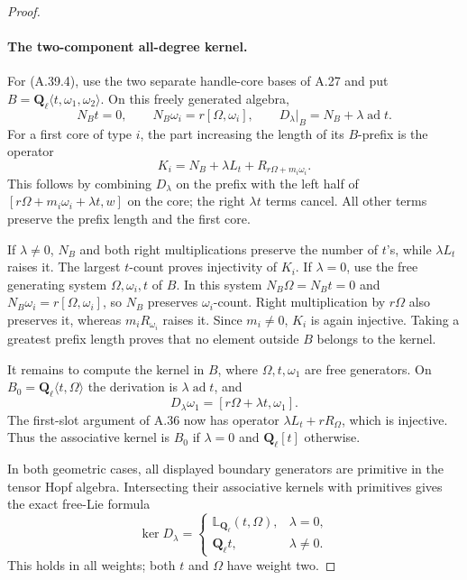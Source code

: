 \begin{proof}
\paragraph{The two-component all-degree kernel.}
For (A.39.4), use the two separate handle-core
bases of A.27 and put
\(B=\mathbf Q_\ell\langle t,\omega_1,\omega_2\rangle\).
On this freely generated algebra,
\[
 N_Bt=0,\qquad N_B\omega_i=r[\Omega,\omega_i],
 \qquad D_\lambda|_B=N_B+\lambda\operatorname{ad}t.
                                                               \tag{A.39.8}
\]
For a first core of type \(i\), the part increasing
the length of its \(B\)-prefix is the operator
\[
 K_i=N_B+\lambda L_t+R_{r\Omega+m_i\omega_i}.
                                                               \tag{A.39.9}
\]
This follows by combining \(D_\lambda\) on the
prefix with the left half of
\([r\Omega+m_i\omega_i+\lambda t,w]\) on the
core; the right \(\lambda t\) terms cancel.
All other terms preserve the prefix length and
the first core.

If \(\lambda\ne0\), \(N_B\) and both right
multiplications preserve the number of \(t\)'s,
while \(\lambda L_t\) raises it. The largest
\(t\)-count proves injectivity of \(K_i\).
If \(\lambda=0\), use the free generating system
\(\Omega,\omega_i,t\) of \(B\).
In this system \(N_B\Omega=N_Bt=0\) and
\(N_B\omega_i=r[\Omega,\omega_i]\), so \(N_B\)
preserves \(\omega_i\)-count. Right multiplication
by \(r\Omega\) also preserves it, whereas
\(m_iR_{\omega_i}\) raises it. Since \(m_i\ne0\),
\(K_i\) is again injective. Taking a greatest
prefix length proves that no element outside
\(B\) belongs to the kernel.

It remains to compute the kernel in \(B\), where
\(\Omega,t,\omega_1\) are free generators.
On \(B_0=\mathbf Q_\ell\langle t,\Omega\rangle\)
the derivation is \(\lambda\operatorname{ad}t\),
and
\[
                 D_\lambda\omega_1
                           =[r\Omega+\lambda t,\omega_1].
\]
The first-slot argument of A.36 now has operator
\(\lambda L_t+rR_\Omega\), which is injective.
Thus the associative kernel is \(B_0\) if
\(\lambda=0\) and \(\mathbf Q_\ell[t]\) otherwise.

In both geometric cases, all displayed boundary
generators are primitive in the tensor Hopf
algebra. Intersecting their associative kernels
with primitives gives the exact free-Lie formula
\[
 \ker D_\lambda=
 \begin{cases}
     \mathbb L_{\mathbf Q_\ell}(t,\Omega),&\lambda=0,\\
     \mathbf Q_\ell t,&\lambda\ne0.
 \end{cases}                                           \tag{A.39.10}
\]
This holds in all weights; both \(t\) and
\(\Omega\) have weight two.


\end{proof}
